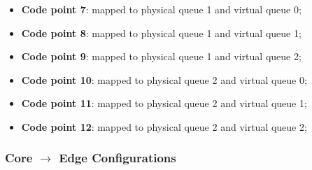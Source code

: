 \documentclass[conference,compsoc]{IEEEtran}
\begin{document}
\begin{itemize}
\begin{itemize}
     \item \textbf{Code point 7}: mapped to physical queue 1 and virtual queue 0;
     \item \textbf{Code point 8}: mapped to physical queue 1 and virtual queue 1;
     \item \textbf{Code point 9}: mapped to physical queue 1 and virtual queue 2;

     \item \textbf{Code point 10}: mapped to physical queue 2 and virtual queue 0;
     \item \textbf{Code point 11}: mapped to physical queue 2 and virtual queue 1;
     \item \textbf{Code point 12}: mapped to physical queue 2 and virtual queue 2;


     \end{itemize}


     \end{itemize}


     \subsubsection{Core $\rightarrow$ Edge Configurations}
\end{document}
